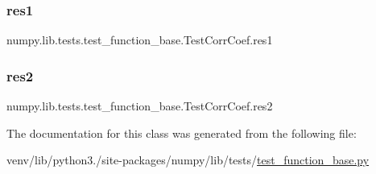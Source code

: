 \subsubsection{\texorpdfstring{res1}{res1}}
{\footnotesize\ttfamily numpy.\+lib.\+tests.\+test\+\_\+function\+\_\+base.\+Test\+Corr\+Coef.\+res1\hspace{0.3cm}{\ttfamily [static]}}

\mbox{\label{classnumpy_1_1lib_1_1tests_1_1test__function__base_1_1TestCorrCoef_adb75a2b9e64d9bfd43e17c9d93fda264}} 
\subsubsection{\texorpdfstring{res2}{res2}}
{\footnotesize\ttfamily numpy.\+lib.\+tests.\+test\+\_\+function\+\_\+base.\+Test\+Corr\+Coef.\+res2\hspace{0.3cm}{\ttfamily [static]}}



The documentation for this class was generated from the following file\+:\begin{DoxyCompactItemize}
\item 
venv/lib/python3./site-\/packages/numpy/lib/tests/\hyperlink{lib_2tests_2test__function__base_8py}{test\+\_\+function\+\_\+base.\+py}\end{DoxyCompactItemize}
